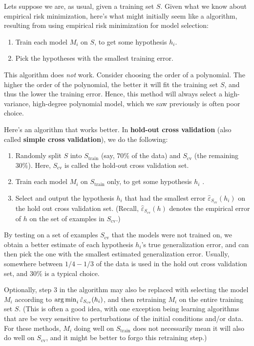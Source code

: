 \vspace{1cm}
\begin{fullwidth}
\label{sec:cross_validation}
\end{fullwidth}
Lets suppose we are, as usual, given a training set $S$. Given what we know
about empirical risk minimization, here's what might initially seem like a
algorithm, resulting from using empirical risk minimization for model selection:
\begin{enumerate}
    \item Train each model $M_i$ on $S$, to get some hypothesis $h_i$.
    \item Pick the hypotheses with the smallest training error.
\end{enumerate}

This algorithm does \textit{not} work. Consider choosing the order of a polynomial.
The higher the order of the polynomial, the better it will fit the
training set $S$, and thus the lower the training error. Hence, this method will
always select a high-variance, high-degree polynomial model, which we saw
previously is often poor choice.

Here's an algorithm that works better. In \textbf{hold-out cross validation}
(also called \textbf{simple cross validation}), we do the following:
\begin{enumerate}
    \item Randomly split $S$ into $S_\text{train}$ (say, $70\%$ of the data) and $S_\text{cv}$ (the remaining $30\%$). Here, $S_\text{cv}$ is called the hold-out cross validation set.
    \item Train each model $M_i$ on $S_\text{train}$ only, to get some hypothesis $h_i$ .
    \item Select and output the hypothesis $h_i$ that had the smallest error $\hat{\varepsilon}_{S_\text{cv}}(h_i)$ on the hold out cross validation set. (Recall,  $\hat{\varepsilon}_{S_\text{cv}}(h)$ denotes the empirical error of $h$ on the set of examples in $S_\text{cv}$.)
\end{enumerate}

By testing on a set of examples $S_\text{cv}$ that the models were not trained on,
we obtain a better estimate of each hypothesis $h_i$'s true generalization error,
and can then pick the one with the smallest estimated generalization error.
Usually, somewhere between $1/4 - 1/3$ of the data is used in the hold out
cross validation set, and $30\%$ is a typical choice.

Optionally, step 3 in the algorithm may also be replaced with selecting
the model $M_i$ according to $\argmin_i \hat{\varepsilon}_{S_\text{cv}}(h_i)$, and then retraining $M_i$ on the
entire training set $S$. (This is often a good idea, with one exception being
learning algorithms that are be very sensitive to perturbations of the initial
conditions and/or data. For these methods, $M_i$ doing well on $S_\text{train}$ does not
necessarily mean it will also do well on $S_\text{cv}$, and it might be better to forgo
this retraining step.)

